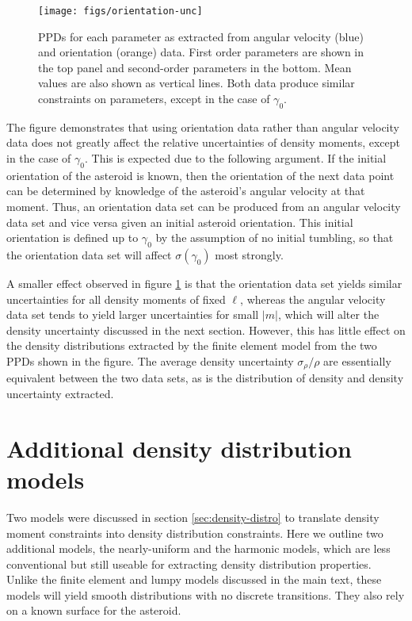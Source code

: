 \begin{figure}
  \centering
  \texttt{[image: figs/orientation-unc]}
  \caption{PPDs for each parameter as extracted from angular velocity (blue) and orientation (orange) data. First order parameters are shown in the top panel and second-order parameters in the bottom. Mean values are also shown as vertical lines. Both data produce similar constraints on parameters, except in the case of $\gamma_0$.}
  \label{fig:orientation-unc}
\end{figure}

The figure demonstrates that using orientation data rather than angular velocity data does not greatly affect the relative uncertainties of density moments, except in the case of $\gamma_0$. This is expected due to the following argument. If the initial orientation of the asteroid is known, then the orientation of the next data point can be determined by knowledge of the asteroid's angular velocity at that moment. Thus, an orientation data set can be produced from an angular velocity data set and vice versa given an initial asteroid orientation. This initial orientation is defined up to $\gamma_0$ by the assumption of no initial tumbling, so that the orientation data set will affect $\sigma(\gamma_0)$ most strongly.

A smaller effect observed in figure \ref{fig:orientation-unc} is that the orientation data set yields similar uncertainties for all density moments of fixed $\ell$, whereas the angular velocity data set tends to yield larger uncertainties for small $|m|$, which will alter the density uncertainty discussed in the next section. However, this has little effect on the density distributions extracted by the finite element model from the two PPDs shown in the figure. The average density uncertainty $\sigma_\rho / \rho$ are essentially equivalent between the two data sets, as is the distribution of density and density uncertainty extracted.




\section{Additional density distribution models}
\label{app:more-models}

Two models were discussed in section \ref{sec:density-distro} to translate density moment constraints into density distribution constraints. Here we outline two additional models, the nearly-uniform and the harmonic models, which are less conventional but still useable for extracting density distribution properties. Unlike the finite element and lumpy models discussed in the main text, these models will yield smooth distributions with no discrete transitions. They also rely on a known surface for the asteroid.

